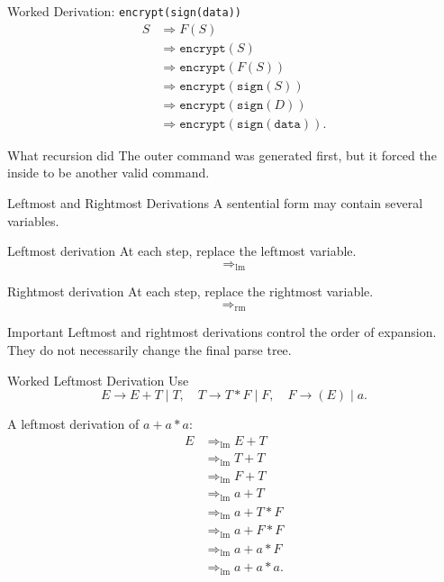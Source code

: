 \documentclass[aspectratio=169,10pt]{beamer}
\newcommand{\der}{\Rightarrow}
\newcommand{\lmder}{\Rightarrow_{\mathrm{lm}}}
\newcommand{\code}[1]{\texttt{#1}}
\begin{document}
\begin{frame}{Worked Derivation: \code{encrypt(sign(data))}}
\small
\[
\begin{aligned}
S
&\der F(S)\\
&\der \code{encrypt}(S)\\
&\der \code{encrypt}(F(S))\\
&\der \code{encrypt}(\code{sign}(S))\\
&\der \code{encrypt}(\code{sign}(D))\\
&\der \code{encrypt}(\code{sign}(\code{data})).
\end{aligned}
\]

\begin{exampleblock}{What recursion did}
The outer command was generated first, but it forced the inside to be another valid command.
\end{exampleblock}
\end{frame}

\begin{frame}{Leftmost and Rightmost Derivations}
\small
A sentential form may contain several variables.

\begin{block}{Leftmost derivation}
At each step, replace the leftmost variable.
\[
\der_{\mathrm{lm}}
\]
\end{block}

\begin{exampleblock}{Rightmost derivation}
At each step, replace the rightmost variable.
\[
\der_{\mathrm{rm}}
\]
\end{exampleblock}

\begin{alertblock}{Important}
Leftmost and rightmost derivations control the order of expansion. They do not necessarily change the final parse tree.
\end{alertblock}
\end{frame}

\begin{frame}{Worked Leftmost Derivation}
\small
Use
\[
E\to E+T\mid T,
\quad
T\to T*F\mid F,
\quad
F\to (E)\mid a.
\]

A leftmost derivation of \(a+a*a\):
\begin{align*}
E
&\lmder E+T\\
&\lmder T+T\\
&\lmder F+T\\
&\lmder a+T\\
&\lmder a+T*F\\
&\lmder a+F*F\\
&\lmder a+a*F\\
&\lmder a+a*a.
\end{align*}
\end{frame}
\end{document}
